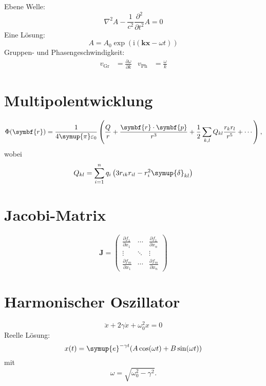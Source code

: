 \documentclass{scrartcl}
\begin{document}
Ebene Welle:
\begin{equation}
  \nabla^2 A - \frac{1}{c^2} \frac{\partial^2}{\partial t^2} A = 0
\end{equation}
Eine Lösung:
\begin{equation}
  A = A_0 \exp(\mathrm{i} (\symbf{k} \symbf{x} - \omega t))
\end{equation}
Gruppen- und Phasengeschwindigkeit:
\begin{align}
  v_\text{Gr} &= \frac{\partial \omega}{\partial k} &
  v_\text{Ph} &= \frac{\omega}{k}
\end{align}

\section{Multipolentwicklung}

\begin{equation}
  \Phi(\symbf{r}) = \frac{1}{4 \symup{\pi} \varepsilon_0} \left(
    \frac{Q}{r} + \frac{\symbf{r} \cdot \symbf{p}}{r^3}
    + \frac{1}{2} \sum_{k, l} Q_{k l} \frac{r_k r_l}{r^5} + \dotsb
  \right) ,
\end{equation}
wobei
\begin{equation*}
  Q_{k l} = \sum_{i = 1}^n q_i \left( 3 r_{i k} r_{i l} - r_i^2 \symup{\delta}_{k l} \right)
\end{equation*}

\section{Jacobi-Matrix}

\begin{equation}
  \symbf{J} =
  \begin{pmatrix}
    \frac{\partial f_1}{\partial x_1} & \cdots  & \frac{\partial f_1}{\partial x_n} \\
    \vdots                            & \ddots  & \vdots                            \\
    \frac{\partial f_m}{\partial x_1} & \cdots  & \frac{\partial f_m}{\partial x_n}
  \end{pmatrix}
\end{equation}

\section{Harmonischer Oszillator}

\begin{equation}
  \ddot{x} + 2 \gamma \dot{x} + \omega_0^2 x = 0 
\end{equation}
Reelle Lösung:
\begin{equation}
  x(t) = \symup{e}^{-\gamma t} (A \cos(\omega t) + B \sin(\omega t))
\end{equation}
mit
\begin{equation}
  \omega = \sqrt{\omega_0^2 - \gamma^2} .
\end{equation}
\end{document}
